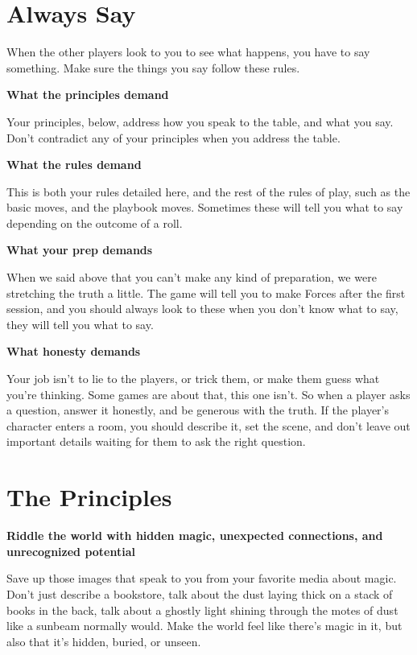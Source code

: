 \documentclass[
  oneside,
  statementpaper,
  9pt]{memoir}
\begin{document}
\hypertarget{always-say}{%
\section{Always Say}\label{always-say}}

When the other players look to you to see what happens, you have to say
something. Make sure the things you say follow these rules.

\textbf{What the principles demand}

Your principles, below, address how you speak to the table, and what you
say. Don't contradict any of your principles when you address the table.

\textbf{What the rules demand}

This is both your rules detailed here, and the rest of the rules of
play, such as the basic moves, and the playbook moves. Sometimes these
will tell you what to say depending on the outcome of a roll.

\textbf{What your prep demands}

When we said above that you can't make any kind of preparation, we were
stretching the truth a little. The game will tell you to make Forces
after the first session, and you should always look to these when you
don't know what to say, they will tell you what to say.

\textbf{What honesty demands}

Your job isn't to lie to the players, or trick them, or make them guess
what you're thinking. Some games are about that, this one isn't. So when
a player asks a question, answer it honestly, and be generous with the
truth. If the player's character enters a room, you should describe it,
set the scene, and don't leave out important details waiting for them to
ask the right question.

\hypertarget{the-principles}{%
\section{The Principles}\label{the-principles}}

\textbf{Riddle the world with hidden magic, unexpected connections, and
unrecognized potential}

Save up those images that speak to you from your favorite media about
magic. Don't just describe a bookstore, talk about the dust laying thick
on a stack of books in the back, talk about a ghostly light shining
through the motes of dust like a sunbeam normally would. Make the world
feel like there's magic in it, but also that it's hidden, buried, or
unseen.
\end{document}
